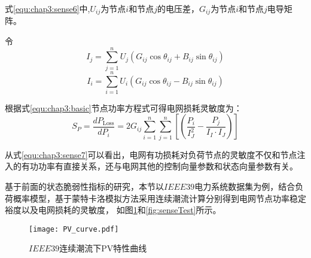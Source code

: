 式\ref{equ:chap3:sense6}中,$U_{ij}$为节点$i$和节点$j$的电压差，$G_{ij}$为节点$i$和节点$j$电导矩阵。

令$$I_j = \sum_{j=1}^{n} U_{j}\left(G_{i j} \cos \theta_{i j}+B_{i j} \sin \theta_{i j}\right)$$
$$I_i = \sum_{i=1}^{n} U_{i}\left(G_{i j} \cos \theta_{i j}-B_{i j} \sin \theta_{i j}\right)$$

根据式\ref{equ:chap3:basic}节点功率方程式可得电网损耗灵敏度为：
\begin{equation}
  \label{equ:chap3:sense7}
  S_P = \frac{d P_{\text {Loss}}}{d P_{i}}=2 G_{i j} \sum_{i=1}^{n} \sum_{j=1}^{n}\left[\left(\frac{P_{i}}{I_{J}^{2}}-\frac{P_{j}}{I_{I} \cdot I_{J}}\right)\right]
\end{equation}

从式\ref{equ:chap3:sense7}可以看出，电网有功损耗对负荷节点的灵敏度不仅和节点注入的有功功率有直接关系，还与电网其他的控制向量参数和状态向量参数有关。


基于前面的状态脆弱性指标的研究，本节以$IEEE39$电力系统数据集为例，结合负荷概率模型，基于蒙特卡洛模拟方法采用连续潮流计算分别得到电网节点功率稳定裕度以及电网损耗的灵敏度，
如图\ref{fig:PV_curve}和\ref{fig:senseTest}所示。

  


\begin{figure}[H] 
  \centering
  \texttt{[image: PV\_curve.pdf]}
  \caption{$IEEE39$连续潮流下PV特性曲线}
  \label{fig:PV_curve}
\end{figure}

